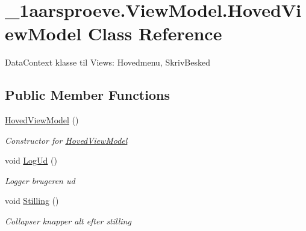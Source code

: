 \hypertarget{class__1aarsproeve_1_1_view_model_1_1_hoved_view_model}{}\section{\+\_\+1aarsproeve.\+View\+Model.\+Hoved\+View\+Model Class Reference}
\label{class__1aarsproeve_1_1_view_model_1_1_hoved_view_model}


Data\+Context klasse til Views\+: Hovedmenu, Skriv\+Besked  


\subsection*{Public Member Functions}
\begin{DoxyCompactItemize}
\item 
\hyperlink{class__1aarsproeve_1_1_view_model_1_1_hoved_view_model_ad1f93a3cec1e8f3b2272a4e92adb2815}{Hoved\+View\+Model} ()
\begin{DoxyCompactList}\small\item\em Constructor for \hyperlink{class__1aarsproeve_1_1_view_model_1_1_hoved_view_model}{Hoved\+View\+Model} \end{DoxyCompactList}\item 
void \hyperlink{class__1aarsproeve_1_1_view_model_1_1_hoved_view_model_ab9eeed2082ee607e4243559b1750eb8e}{Log\+Ud} ()
\begin{DoxyCompactList}\small\item\em Logger brugeren ud \end{DoxyCompactList}\item 
void \hyperlink{class__1aarsproeve_1_1_view_model_1_1_hoved_view_model_accaf70389376abb55df383d44edd5842}{Stilling} ()
\begin{DoxyCompactList}\small\item\em Collapser knapper alt efter stilling \end{DoxyCompactList}\end{DoxyCompactItemize}
